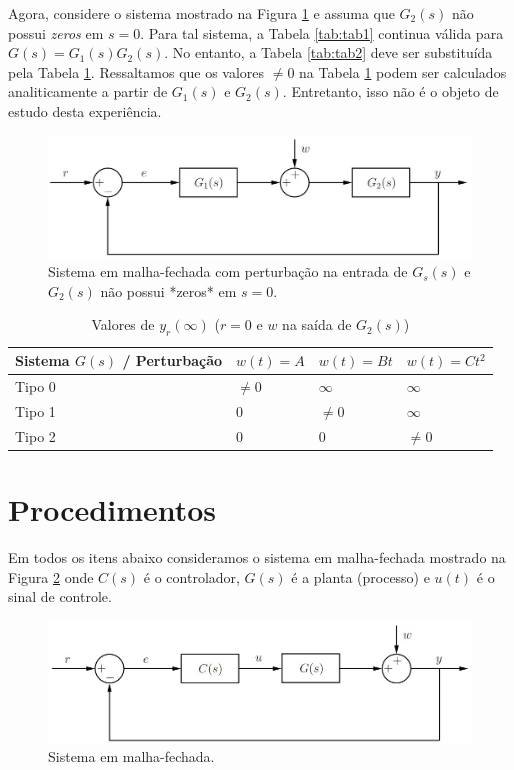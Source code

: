 \documentclass[
]{book}
\begin{document}
Agora, considere o sistema mostrado na Figura \ref{fig:fig2} e assuma que \(G_2(s)\) não possui \emph{zeros} em \(s=0\). Para tal sistema, a Tabela \ref{tab:tab1} continua válida para \(G(s) = G_1(s)G_2(s)\). No entanto, a Tabela \ref{tab:tab2} deve ser substituída pela Tabela \ref{tab:tab3}. Ressaltamos que os valores \(\neq 0\) na Tabela \ref{tab:tab3} podem ser calculados analiticamente a partir de \(G_1(s) \text{ e } G_2(s)\). Entretanto, isso não é o objeto de estudo desta experiência.

\begin{figure}
\includegraphics[width=1\linewidth]{Imagens/Lab4/Apresentação/fig2} \caption{Sistema em malha-fechada com perturbação na entrada de $G_s(s)$ e $G_2(s)$ não possui *zeros* em $s=0$.}\label{fig:fig2}
\end{figure}

\begin{table}

\caption{\label{tab:tab3}Valores de $y_r(\infty)$ ($r=0$ e $w$ na saída de $G_2(s)$)}
\centering
\begin{tabular}[t]{llll}
\toprule
Sistema $G(s)$ / Perturbação & $w(t)=A$ & $w(t) = Bt$ & $w(t) = Ct^2$\\
\midrule
Tipo 0 & $\neq 0$ & $\infty$ & $\infty$\\
Tipo 1 & 0 & $\neq 0$ & $\infty$\\
Tipo 2 & 0 & 0 & $\neq 0$\\
\bottomrule
\end{tabular}
\end{table}

\hypertarget{procedimentos-2}{%
\section{Procedimentos}\label{procedimentos-2}}

Em todos os itens abaixo consideramos o sistema em malha-fechada mostrado na Figura \ref{fig:fig3} onde \(C(s)\) é o controlador, \(G(s)\) é a planta (processo) e \(u(t)\) é o sinal de controle.

\begin{figure}
\includegraphics[width=1\linewidth]{Imagens/Lab4/Apresentação/fig3} \caption{Sistema em malha-fechada.}\label{fig:fig3}
\end{figure}
\end{document}
